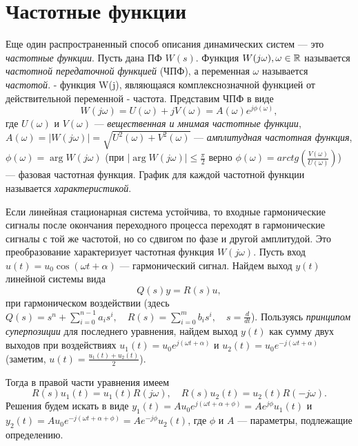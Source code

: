 \documentclass[../../TAU.tex]{subfiles}
\begin{document}
\section{Частотные функции} %
    Еще один распространенный способ описания динамических систем --- это {\it частотные функции}.
    Пусть дана ПФ $W(s)$. Функция 
    $W(j\omega), \omega\in\mathbb{R}$ 
    называется {\it частотной передаточной функцией} (ЧПФ), а переменная $\omega$ называется {\it частотой}.
     - функция W(j), являющаяся комплекснозначной функцией от действительной переменной - частота. 
    Представим ЧПФ в виде
    $$
        W(j\omega) = U(\omega) + jV(\omega) = A(\omega)e^{j\phi(\omega)},
    $$
    где 
    $U(\omega)$ и $V(\omega)$ 
    --- {\it вещественная и мнимая частотные функции}, 
    $A(\omega) = |W(j\omega)| = \sqrt{U^2(\omega)+V^2(\omega)}$ 
    --- {\it амплитудная частотная функция}, 
    $\phi(\omega) = \arg{W(j\omega)}$ (при 
    $|\arg{W(j\omega)}| \le \frac{\pi}{2}$ верно 
    $\phi(\omega) = arctg\left(\frac{V(\omega)}{U(\omega)}\right)$) 
    --- фазовая частотная функция.
    График для каждой частотной функции называется {\it характеристикой}.\par
    Если линейная стационарная система устойчива, то входные гармонические сигналы после окончания переходного процесса переходят в гармонические сигналы с той же частотой, но со сдвигом по фазе и другой амплитудой. Это преобразование характеризует частотная функция 
    $W(j\omega)$.
    Пусть вход 
    $u(t) = u_0 \cos(\omega t + \alpha)$ 
    --- гармонический сигнал. Найдем выход $y(t)$ линейной системы вида
    \begin{equation}\label{EQ_ODU_SYM_2}
        Q(s)y = R(s)u,
    \end{equation}
    при гармоническом воздействии (здесь 
    $Q(s) = s^n + \sum_{i=0}^{n-1}a_is^i,\quad R(s) = \sum_{i=0}^{m}b_is^i, \quad s=\frac{d}{dt}$). 
    Пользуясь {\it принципом суперпозиции} для последнего уравнения, найдем выход $y(t)$ как сумму двух выходов при воздействиях 
    $u_1(t) = u_0e^{j(\omega t+\alpha)}$ и 
    $u_2(t) = u_0e^{-j(\omega t+\alpha)}$ (заметим, 
    $u(t) = \frac{u_1(t)+u_2(t)}{2}$).\par
    Тогда в правой части уравнения имеем
    $$
        R(s)u_1(t) = u_1(t)R(j\omega),\quad R(s)u_2(t) = u_2(t)R(-j\omega).
    $$
    Решения будем искать в виде $y_1(t) = A u_0e^{j(\omega t + \alpha + \phi)} = Ae^{j\phi}u_1(t)$ и $y_2(t) = A u_0e^{-j(\omega t + \alpha + \phi)} = Ae^{-j\phi}u_2(t)$, где $\phi$ и $A$ --- параметры, подлежащие определению.
\end{document}
